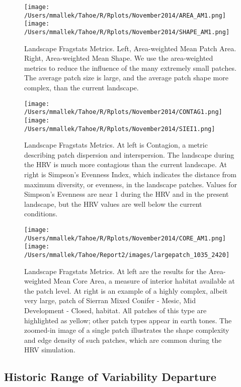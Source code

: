 \begin{figure}
\texttt{[image: /Users/mmallek/Tahoe/R/Rplots/November2014/AREA\_AM1.png]}
\texttt{[image: /Users/mmallek/Tahoe/R/Rplots/November2014/SHAPE\_AM1.png]}
\caption{Landscape Fragstats Metrics. Left, Area-weighted Mean Patch Area. Right, Area-weighted Mean Shape. We use the area-weighted metrics to reduce the influence of the many extremely small patches. The average patch size is large, and the average patch shape more complex, than the current landscape.} 
\label{landscapestory1}
\end{figure}

\begin{figure}
\texttt{[image: /Users/mmallek/Tahoe/R/Rplots/November2014/CONTAG1.png]}
\texttt{[image: /Users/mmallek/Tahoe/R/Rplots/November2014/SIEI1.png]}
\caption{Landscape Fragstats Metrics. At left is Contagion, a metric describing patch dispersion and interspersion. The landscape during the HRV is much more contagious than the current landscape. At right is Simpson's Evenness Index, which indicates the distance from maximum diversity, or evenness, in the landscape patches. Values for Simpson's Evenness are near 1 during the HRV and in the present landscape, but the HRV values are well below the current conditions.} 
\label{landscapestory2}
\end{figure}

\begin{figure}
\texttt{[image: /Users/mmallek/Tahoe/R/Rplots/November2014/CORE\_AM1.png]}
\texttt{[image: /Users/mmallek/Tahoe/Report2/images/largepatch\_1035\_2420]}
\caption{Landscape Fragstats Metrics. At left are the results for the Area-weighted Mean Core Area, a measure of interior habitat available at the patch level. At right is an example of a highly complex, albeit very large, patch of Sierran Mixed Conifer - Mesic, Mid Development - Closed, habitat. All patches of this type are highlighted as yellow; other patch types appear in earth tones. The zoomed-in image of a single patch illustrates the shape complexity and edge density of such patches, which are common during the HRV simulation.} 
\label{landscapestory3}
\end{figure}

\subsection{Historic Range of Variability Departure}

